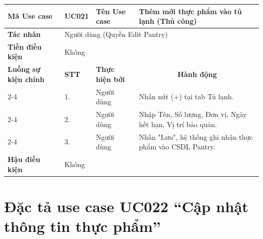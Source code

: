 \begin{longtable}{|p{2.7cm}|p{0.8cm}|p{2.6cm}|p{7.3cm}|}
\hline
\cellcolor[HTML]{D5F5E3}\textbf{Mã Use case} & \multicolumn{1}{l|}{UC021} & \cellcolor[HTML]{D5F5E3}\textbf{Tên Use case} & Thêm mới thực phẩm vào tủ lạnh (Thủ công) \\ \hline
\cellcolor[HTML]{D5F5E3}\textbf{Tác nhân} & \multicolumn{3}{p{10.7cm}|}{Người dùng (Quyền Edit Pantry)} \\ \hline
\cellcolor[HTML]{D5F5E3}\textbf{Tiền điều kiện} & \multicolumn{3}{p{10.7cm}|}{Không} \\ \hline

\cellcolor[HTML]{D5F5E3}\textbf{Luồng sự kiện chính} & \cellcolor[HTML]{FDEBD0}\textbf{STT} & \cellcolor[HTML]{FDEBD0}\textbf{Thực hiện bởi} & \multicolumn{1}{c|}{\cellcolor[HTML]{FDEBD0}\textbf{Hành động}} \\ \cline{2-4} 
\cellcolor[HTML]{D5F5E3} & 1. & Người dùng & Nhấn nút (+) tại tab Tủ lạnh. \\ \cline{2-4} 
\cellcolor[HTML]{D5F5E3} & 2. & Người dùng & Nhập Tên, Số lượng, Đơn vị, Ngày hết hạn, Vị trí bảo quản. \\ \cline{2-4} 
\cellcolor[HTML]{D5F5E3} & 3. & Người dùng & Nhấn "Lưu", hệ thống ghi nhận thực phẩm vào CSDL Pantry. \\ \hline

\cellcolor[HTML]{D5F5E3}\textbf{Hậu điều kiện} & \multicolumn{3}{p{10.7cm}|}{Không} \\ \hline
\end{longtable}
\endgroup

\section{Đặc tả use case UC022 ``Cập nhật thông tin thực phẩm''}
\vspace{0.5cm}

\begingroup
\renewcommand{\arraystretch}{1.5}

